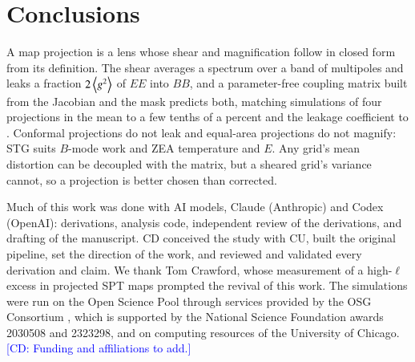 \documentclass{aa}
\newcommand{\CD}[1]{\textcolor{blue}{[CD: #1]}}
\newcommand{\gsq}{\expval{g^2}}
\begin{document}
\section{Conclusions} \label{sec:conclusions}

A map projection is a lens whose shear and magnification follow in closed form from its definition.
The shear averages a spectrum over a band of multipoles and leaks a fraction $2\gsq$ of $EE$ into $BB$, and a parameter-free coupling matrix built from the Jacobian and the mask predicts both, matching simulations of four projections in the mean to a few tenths of a percent and the leakage coefficient to \fitoffset.
Conformal projections do not leak and equal-area projections do not magnify: STG suits $B$-mode work and ZEA temperature and $E$.
Any grid's mean distortion can be decoupled with the matrix, but a sheared grid's variance cannot, so a projection is better chosen than corrected.

\begin{acknowledgements}
Much of this work was done with AI models, Claude (Anthropic) and Codex (OpenAI): derivations, analysis code, independent review of the derivations, and drafting of the manuscript.
CD conceived the study with CU, built the original pipeline, set the direction of the work, and reviewed and validated every derivation and claim.
We thank Tom Crawford, whose measurement of a high-$\ell$ excess in projected SPT maps prompted the revival of this work.
The simulations were run on the Open Science Pool through services provided by the OSG Consortium \citep{osg07, osg09, ospool}, which is supported by the National Science Foundation awards 2030508 and 2323298, and on computing resources of the University of Chicago.
\CD{Funding and affiliations to add.}
\end{acknowledgements}



\end{document}
